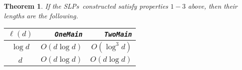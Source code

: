\documentclass[12pt]{article}
\newtheorem{theorem}[definition]{Theorem}
\def\Oh{O}  %
\def\SLPs{{\rm SLPs}}
\begin{document}
\begin{theorem} 
If the \SLPs\ constructed satisfy properties $1-3$ above,
then their lengths are the following.
\begin{center}
\begin{tabular}
{|c|r|r|} \hline
$\ell (d)$  & {\tt OneMain}  & {\tt TwoMain} \rule{0cm}{3.0ex}\\
\hline
$\log d$  &  $\Oh(d \log d)$ & $\Oh(\log^3 d)$ \rule{0cm}{3.0ex}\\ \hline
$d$  &  $\Oh(d \log d)$ & $\Oh(d \log d)$ \rule{0cm}{3.0ex}\\ \hline
\end{tabular}
\end{center}

\end{theorem}
\end{document}
